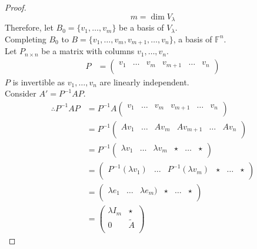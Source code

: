 \documentclass[fleqn, a4paper, 12pt, draft]{article}
\theoremstyle{definition}
\theoremstyle{theorem}
\theoremstyle{remark}
\numberwithin{corollary}{theorem}
\numberwithin{equation}{theorem}
\begin{document}
\begin{proof}
	\begin{equation*}
		m = \dim V_\lambda
	\end{equation*}
	Therefore, let $B_0 = \{v_1, \dots, v_m\}$ be a basis of $V_\lambda$.\\
	Completing $B_0$ to $B = \{v_1, \dots, v_m, v_{m+1}, \dots, v_n\}$, a basis of $\mathbb{F}^n$. \\
	Let $P_{n \times n}$ be a matrix with columns $v_1, \dots, v_n$.
	\begin{align*}
		P &=
		\begin{pmatrix}
			v_1 & \dots & v_m & v_{m+1} & \dots & v_n\\
		\end{pmatrix}
	\end{align*}
	$P$ is invertible as $v_1, \dots, v_n$ are linearly independent.\\
	Consider $A' = P^{-1} A P$.
	\begin{align*}
		\therefore P^{-1} A P &= P^{-1} A 
			\begin{pmatrix}
				v_1 & \dots & v_m & v_{m+1} & \dots & v_n\\
			\end{pmatrix}\\
			&= P^{-1}
				\begin{pmatrix}
					A v_1 & \dots & A v_m & A v_{m+1} & \dots & A v_n\\
				\end{pmatrix}\\
			&= P^{-1} 
				\begin{pmatrix}
					\lambda v_1 & \dots & \lambda v_m & \star & \dots & \star\\
				\end{pmatrix}\\
			&= 
				\begin{pmatrix}
					P^{-1} (\lambda v_1) & \dots & P^{-1} (\lambda v_m) & \star & \dots & \star\\
				\end{pmatrix}\\
			&= 
				\begin{pmatrix}
					\lambda e_1 & \dots & \lambda e_m) & \star & \dots & \star\\
				\end{pmatrix}\\
			&=
				\begin{pmatrix}
					\lambda I_m & \star\\
					0 & \tilde{A}\\

\end{pmatrix}
\end{align*}
\end{proof}
\end{document}
